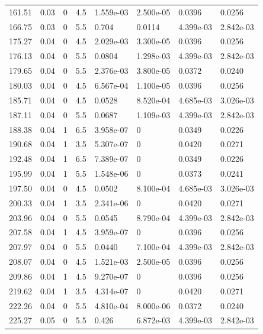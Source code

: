 \documentclass[preview]{standalone}
\begin{document}
{{{\begin{tabular}{L{1.2cm}C{1.2cm} C{0.3cm}C{0.5cm} C{1.4cm}C{1.4cm} C{1.4cm}C{1.4cm}}
  161.51  &  0.03  & 0     & 4.5 &  1.559e-03  & 2.500e-05  & 0.0396 &  0.0256   \\ 
  166.75  &  0.03  & 0     & 5.5 &  0.704  & 0.0114  & 4.399e-03 &  2.842e-03   \\ 
  175.27  &  0.04  & 0     & 4.5 &  2.029e-03  & 3.300e-05  & 0.0396 &  0.0256   \\ 
  176.13  &  0.04  & 0     & 5.5 &  0.0804  & 1.298e-03  & 4.399e-03 &  2.842e-03   \\ 
  179.65  &  0.04  & 0     & 5.5 &  2.376e-03  & 3.800e-05  & 0.0372 &  0.0240   \\ 
  180.03  &  0.04  & 0     & 4.5 &  6.567e-04  & 1.100e-05  & 0.0396 &  0.0256   \\ 
  185.71  &  0.04  & 0     & 4.5 &  0.0528  & 8.520e-04  & 4.685e-03 &  3.026e-03   \\ 
  187.11  &  0.04  & 0     & 5.5 &  0.0687  & 1.109e-03  & 4.399e-03 &  2.842e-03   \\ 
  188.38  &  0.04  & 1     & 6.5 &  3.958e-07  & 0  & 0.0349 &  0.0226   \\ 
  190.68  &  0.04  & 1     & 3.5 &  5.307e-07  & 0  & 0.0420 &  0.0271   \\ 
  192.48  &  0.04  & 1     & 6.5 &  7.389e-07  & 0  & 0.0349 &  0.0226   \\ 
  195.99  &  0.04  & 1     & 5.5 &  1.548e-06  & 0  & 0.0373 &  0.0241   \\ 
  197.50  &  0.04  & 0     & 4.5 &  0.0502  & 8.100e-04  & 4.685e-03 &  3.026e-03   \\ 
  200.33  &  0.04  & 1     & 3.5 &  2.341e-06  & 0  & 0.0420 &  0.0271   \\ 
  203.96  &  0.04  & 0     & 5.5 &  0.0545  & 8.790e-04  & 4.399e-03 &  2.842e-03   \\ 
  207.58  &  0.04  & 1     & 4.5 &  3.959e-07  & 0  & 0.0396 &  0.0256   \\ 
  207.97  &  0.04  & 0     & 5.5 &  0.0440  & 7.100e-04  & 4.399e-03 &  2.842e-03   \\ 
  208.07  &  0.04  & 0     & 4.5 &  1.521e-03  & 2.500e-05  & 0.0396 &  0.0256   \\ 
  209.86  &  0.04  & 1     & 4.5 &  9.270e-07  & 0  & 0.0396 &  0.0256   \\ 
  219.62  &  0.04  & 1     & 3.5 &  4.314e-07  & 0  & 0.0420 &  0.0271   \\ 
  222.26  &  0.04  & 0     & 5.5 &  4.810e-04  & 8.000e-06  & 0.0372 &  0.0240   \\ 
  225.27  &  0.05  & 0     & 5.5 &  0.426  & 6.872e-03  & 4.399e-03 &  2.842e-03   \\ 

\end{tabular}}}}
\end{document}
